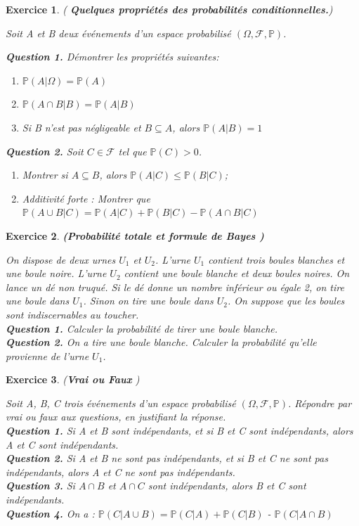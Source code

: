 \documentclass[12pt,a4paper]{article}
\newtheorem{exercice}{Exercice}
\renewcommand{\leq}{\leqslant}
\begin{document}
\begin{exercice} ( \textbf{Quelques propriétés des probabilités conditionnelles.})  \par 
Soit A et B deux événements d'un espace probabilisé $(\Omega, \mathcal{F}, \mathbb{P})$. \par
\textbf{Question 1.} Démontrer les propriétés suivantes:
\begin{enumerate}
    \item  $\mathbb{P}(A | \Omega ) = \mathbb{P}(A)$
    \item $\mathbb{P}(A \cap B | B) = \mathbb{P}(A | B)$ 
    \item Si B n'est pas négligeable et $B \subseteq A$, alors $\mathbb{P}(A | B) = 1$ 
\end{enumerate} 
\textbf{Question 2.} Soit $C \in \mathcal{F}$ tel que $\mathbb{P}( C) > 0$. 
\begin{enumerate}
    \item Montrer si $A \subseteq B$, alors $\mathbb{P}(A | C) \leq \mathbb{P}(B | C)$; 
    \item Additivité forte : Montrer que  $\mathbb{P}( A\cup B | C)= \mathbb{P}( A| C) + \mathbb{P}( B | C) - \mathbb{P}(A\cap B | C)$
\end{enumerate}
\end{exercice}

\begin{exercice} \textbf{(Probabilité totale et formule de Bayes )}

On dispose de deux urnes $U_1$ et $U_2$. L'urne $U_1$ contient trois boules blanches et une boule noire. L'urne $U_2$ contient une boule blanche et deux boules noires. On lance un dé non truqué. Si le dé donne un nombre inférieur ou égale 2, on tire une boule dans $U_1$. Sinon on tire une boule dans $U_2$. On suppose que les boules sont indiscernables au toucher. \\ 

\textbf{Question 1.} Calculer la probabilité de tirer une boule blanche. \\
\textbf{Question 2.} On a tire une boule blanche. Calculer la probabilité qu'elle provienne de l'urne $U_1$.
\end{exercice}

\begin{exercice} (\textbf{Vrai ou Faux } ) \par
Soit A, B, C trois événements d'un espace probabilisé $(\Omega, \mathcal{F}, \mathbb{P})$. Répondre par vrai ou faux aux questions, en justifiant la réponse. \\
\textbf{Question 1.} Si A et B sont indépendants, et si B et C sont indépendants, alors A et C sont indépendants. \\
\textbf{Question 2.} Si A et B ne sont pas indépendants, et si B et C ne sont pas indépendants, alors A et C ne sont pas indépendants. \\
\textbf{Question 3.} Si $A\cap B$ et $A \cap C$ sont indépendants, alors B et C sont
indépendants. \\
\textbf{Question 4.} On a : $\mathbb{P}(C | A\cup B) = \mathbb{P}(C| A) + \mathbb{P}(C | B)$ - $\mathbb{P}(C | A\cap B)$
\end{exercice}
\end{document}
